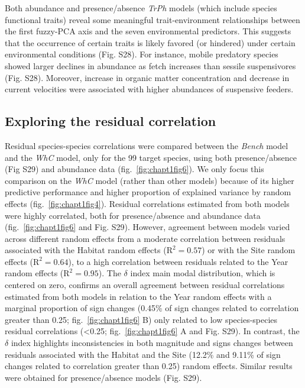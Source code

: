 \documentclass[9pt,biorxiv,doublespacing,lineno]{lapreprint}
\begin{document}
Both abundance and presence/absence \emph{TrPh} models (which include
species functional traits) reveal some meaningful trait-environment
relationships between the first fuzzy-PCA axis and the seven
environmental predictors. This suggests that the occurrence of certain
traits is likely favored (or hindered) under certain environmental
conditions (Fig. S28). For instance, mobile predatory species showed
larger declines in abundance as fetch increases than sessile
suspensivores (Fig. S28). Moreover, increase in organic matter
concentration and decrease in current velocities were associated with
higher abundances of suspensive feeders.

\hypertarget{exploring-the-residual-correlation}{%
\subsection{Exploring the residual
correlation}\label{exploring-the-residual-correlation}}

Residual species-species correlations were compared between the
\emph{Bench} model and the \emph{WhC} model, only for the 99 target
species, using both presence/absence (Fig S29) and abundance data
(fig.~\ref{fig:chapt1fig6}). We only focus this comparison on the
\emph{WhC} model (rather than other models) because of its higher
predictive performance and higher proportion of explained variance by
random effects (fig.~\ref{fig:chapt1fig4}). Residual correlations
estimated from both models were highly correlated, both for
presence/absence and abundance data (fig.~\ref{fig:chapt1fig6} and Fig.
S29). However, agreement between models varied across different random
effects from a moderate correlation between residuals associated with
the Habitat random effects (\(\text{R}^2=0.57\)) or with the Site random
effects (\(\text{R}^2=0.64\)), to a high correlation between residuals
related to the Year random effects (\(\text{R}^2=0.95\)). The \(\delta\)
index main modal distribution, which is centered on zero, confirms an
overall agreement between residual correlations estimated from both
models in relation to the Year random effects with a marginal proportion
of sign changes (0.45\% of sign changes related to correlation greater
than 0.25; fig.~\ref{fig:chapt1fig6} B) only related to low
species-species residual correlations (\textless0.25;
fig.~\ref{fig:chapt1fig6} A and Fig. S29). In contrast, the \(\delta\)
index highlights inconsistencies in both magnitude and signs changes
between residuals associated with the Habitat and the Site (12.2\% and
9.11\% of sign changes related to correlation greater than 0.25) random
effects. Similar results were obtained for presence/absence models (Fig.
S29).
\end{document}
